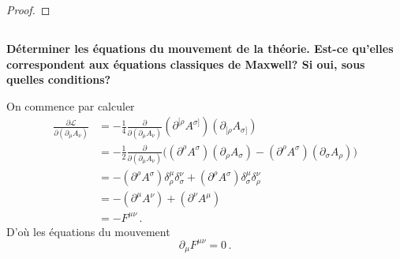 \documentclass{article}
\numberwithin{equation}{section}
\theoremstyle{solution}
\newtheorem{solution}{Réponse}[section]
\begin{document}
\begin{proof}
        

\end{proof}
\subsection{}
\textbf{Déterminer les équations du mouvement de la théorie. Est-ce qu’elles correspondent aux
équations classiques de Maxwell? Si oui, sous quelles conditions?}
\vspace{2ex}

On commence par calculer
\begin{align*}
        \frac{\partial \mathcal{L}}{\partial (\partial_{\mu}A_\nu)} &= -\frac{1}{4}\frac{\partial }{\partial (\partial_{\mu}A_\nu)} (\partial^{[\rho}A^{\sigma]})(\partial_{[\rho}A_{\sigma]}) \\
                &= -\frac{1}{2}\frac{\partial }{\partial (\partial_{\mu}A_\nu)} \big((\partial^{\rho}A^{\sigma})(\partial_{\rho}A_\sigma) - (\partial^{\rho}A^{\sigma})(\partial_{\sigma}A_\rho) \big)\\
                &= -(\partial^{\rho}A^{\sigma})\delta_\rho^{\mu}\delta_\sigma^{\nu} + (\partial^{\rho}A^{\sigma})\delta_\sigma^{\mu}\delta_\rho^{\nu}\\
                &= -(\partial^{\mu}A^{\nu}) + (\partial^{\nu}A^{\mu})\\
                &= -F^{\mu\nu}\, .
\end{align*}
D'où les équations du mouvement
\begin{equation}\label{eq:eq mouvement}
        \boxed{\partial_{\mu}F^{\mu\nu} = 0 }\, .
\end{equation} 
\end{document}
